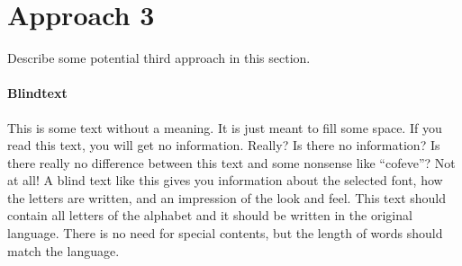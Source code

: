\section{Approach 3} \label{approach3} %

Describe some potential third approach in this section.

\paragraph{Blindtext} This is some text without a meaning. It is just meant to fill some space. If you read this text, you will get no information. Really? Is there no information? Is there really no difference between this text and some nonsense like ``cofeve''? Not at all! A blind text like this gives you information about the selected font, how the letters are written, and an impression of the look and feel. This text should contain all letters of the alphabet and it should be written in the original language. There is no need for special contents, but the length of words should match the language.
